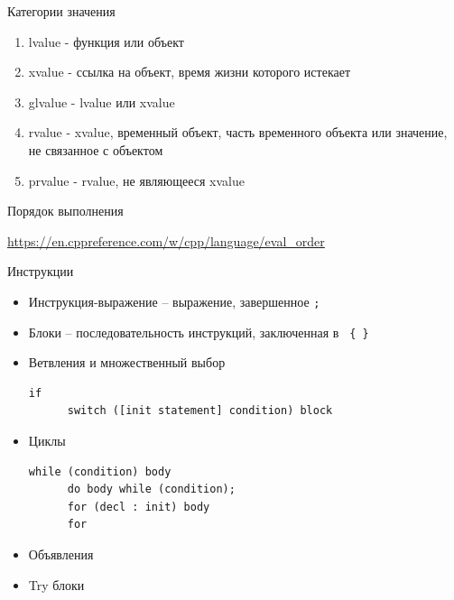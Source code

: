 \documentclass[unknownkeysallowed]{beamer}
\begin{document}
\begin{frame}{Категории значения}

\begin{enumerate}
  \item lvalue - функция или объект \vspace{1em}
  \item xvalue - ссылка на объект, время жизни которого истекает \vspace{1em}
  \item glvalue - lvalue или xvalue \vspace{1em}
  \item rvalue - xvalue, временный объект, часть временного объекта или значение, не связанное с объектом \vspace{1em}
  \item prvalue - rvalue, не являющееся xvalue \vspace{1em}
\end{enumerate}

\end{frame}

\begin{frame}{Порядок выполнения}

\url{https://en.cppreference.com/w/cpp/language/eval_order}

\end{frame}

\begin{frame}[fragile]{Инструкции}

\begin{itemize}

  \item Инструкция-выражение -- выражение, завершенное \lstinline[basicstyle=\ttfamily\small]{;}
  
  \item Блоки -- последовательность инструкций, заключенная в \lstinline[basicstyle=\ttfamily\small]| { } |
  
  \item Ветвления и множественный выбор
    \begin{lstlisting}[basicstyle=\ttfamily\small]
      if
      switch ([init statement] condition) block
    \end{lstlisting}

  \item Циклы
    \begin{lstlisting}[basicstyle=\ttfamily\small]
      while (condition) body
      do body while (condition);
      for (decl : init) body
      for
    \end{lstlisting}

  \item Объявления
  
  \item Try блоки

\end{itemize}

\end{frame}
\end{document}
